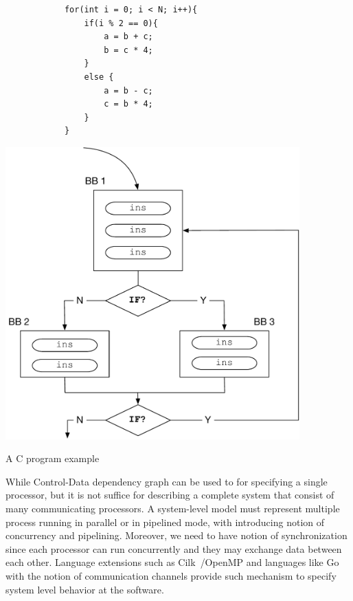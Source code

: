 \begin{listing}[!h]
    \begin{minipage}{0.5\textwidth}
        \begin{verbatim}
            for(int i = 0; i < N; i++){
                if(i % 2 == 0){
                    a = b + c;
                    b = c * 4;
                }
                else {
                    a = b - c;
                    c = b * 4;
                }
            }
        \end{verbatim}
    \end{minipage}
    \begin{minipage}{0.5\textwidth}
       \includegraphics[width=0.85\textwidth]{figures/Introduction/CFG.pdf}
    \end{minipage}
    \caption{A C program example}
    \label{fig:c_example}
\end{listing}


While Control-Data dependency graph can be used to for specifying a single processor, but it is not suffice for describing a complete system that consist of many communicating processors.
A system-level model must represent multiple process running in parallel or in pipelined mode, with introducing notion of concurrency and pipelining.
Moreover, we need to have notion of synchronization since each processor can run concurrently and they may exchange data between each other.
Language extensions such as Cilk~\cite{cilk}/OpenMP and languages like Go with the notion of communication channels provide such mechanism to specify system level behavior at the software.

